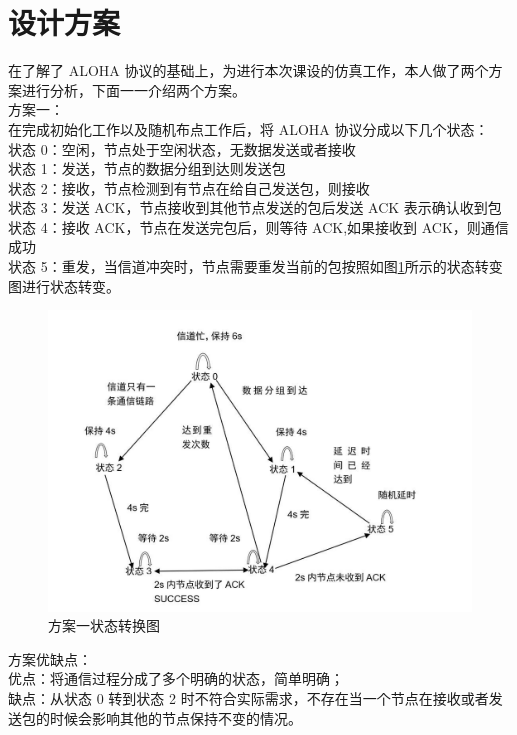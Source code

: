\documentclass{article}
\begin{document}
	\section{设计方案}
	在了解了 ALOHA 协议的基础上，为进行本次课设的仿真工作，本人做了两个方案进行分析，下面一一介绍两个方案。\\
	方案一：\\
	在完成初始化工作以及随机布点工作后，将 ALOHA 协议分成以下几个状态：\\
	状态 0：空闲，节点处于空闲状态，无数据发送或者接收\\
	状态 1：发送，节点的数据分组到达则发送包\\
	状态 2：接收，节点检测到有节点在给自己发送包，则接收\\
	状态 3：发送 ACK，节点接收到其他节点发送的包后发送 ACK 表示确认收到包\\
	状态 4：接收 ACK，节点在发送完包后，则等待 ACK,如果接收到 ACK，则通信成功\\
	状态 5：重发，当信道冲突时，节点需要重发当前的包按照如图\ref{fig-3}所示的状态转变图进行状态转变。
	\\
		\begin{figure}[htbp]
			\centering
			\includegraphics[scale=0.5]{3}
			\caption{方案一状态转换图}
			\label{fig-3}
		\end{figure}
	\par
	方案优缺点：\\
	优点：将通信过程分成了多个明确的状态，简单明确；\\
	缺点：从状态 0 转到状态 2 时不符合实际需求，不存在当一个节点在接收或者发送包的时候会影响其他的节点保持不变的情况。\\
	
\end{document}
